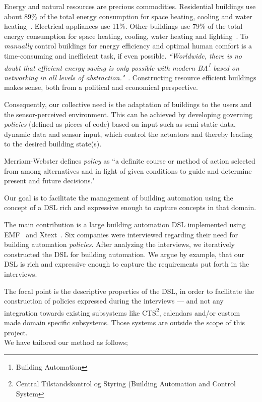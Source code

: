 Energy and natural resources are precious commodities. Residential buildings use about 89\% of the total energy consumption for space heating, cooling and water heating~\cite{janssen2004towards}. Electrical appliances use 11\%. Other buildings use 79\% of the total energy consumption for space heating, cooling, water heating and lighting~\cite{janssen2004towards}. To \textit{manually} control buildings for energy efficiency and optimal human comfort is a time-consuming and inefficient task, if even possible. \textit{``Worldwide, there is no doubt that efficient energy saving is only possible with modern BA\footnote{Building Automation} based on networking in all levels of abstraction."}~\cite{dietrich2010communication}. Constructing resource efficient buildings makes sense, both from a political and economical perspective. 

Consequently, our collective need is the adaptation of buildings to the users and the sensor-perceived environment. This can be achieved by developing governing \textit{policies} (defined as pieces of code) based on input such as semi-static data, dynamic data and sensor input, which control the actuators and thereby leading to the desired building state(s).

Merriam-Webster defines \textit{policy} as ``a definite course or method of action selected from among alternatives and in light of given conditions to guide and determine present and future decisions."

Our goal is to facilitate the management of building automation using the concept of a DSL rich and expressive enough to capture concepts in that domain.

The main contribution is a large building automation DSL implemented using EMF~\cite{emf} and Xtext~\cite{xtext}. Six companies were interviewed regarding their need for building automation \textit{policies}. After analyzing the interviews, we iteratively constructed the DSL for building automation. We argue by example, that our DSL is rich and expressive enough to capture the requirements put forth in the interviews. 

The focal point is the descriptive properties of the DSL, in order to facilitate the construction of policies expressed during the interviews --- and not any integration towards existing subsystems like CTS\footnote{Central Tilstandskontrol og Styring (Building Automation and Control System}, calendars and/or custom made domain specific subsystems. Those systems are outside the scope of this project.
\newline\\
We have tailored our method as follows;

